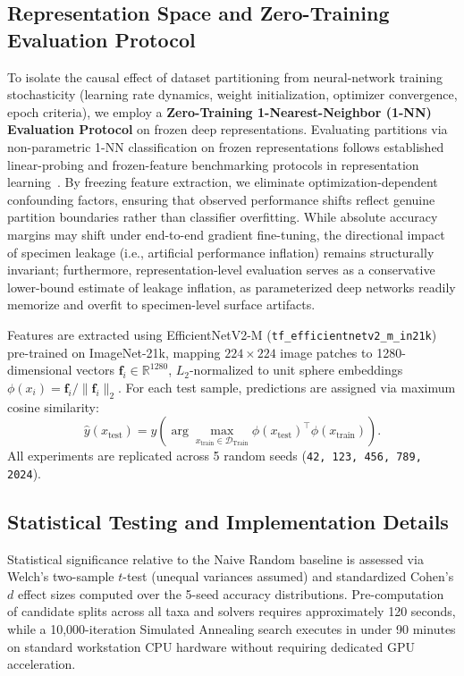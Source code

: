 \documentclass[a4paper,fleqn]{cas-sc}
\begin{document}
\subsection{Representation Space and Zero-Training Evaluation Protocol}
To isolate the causal effect of dataset partitioning from neural-network training stochasticity (learning rate dynamics, weight initialization, optimizer convergence, epoch criteria), we employ a \textbf{Zero-Training 1-Nearest-Neighbor (1-NN) Evaluation Protocol} on frozen deep representations. Evaluating partitions via non-parametric 1-NN classification on frozen representations follows established linear-probing and frozen-feature benchmarking protocols in representation learning~\cite{scikit}. By freezing feature extraction, we eliminate optimization-dependent confounding factors, ensuring that observed performance shifts reflect genuine partition boundaries rather than classifier overfitting. While absolute accuracy margins may shift under end-to-end gradient fine-tuning, the directional impact of specimen leakage (i.e., artificial performance inflation) remains structurally invariant; furthermore, representation-level evaluation serves as a conservative lower-bound estimate of leakage inflation, as parameterized deep networks readily memorize and overfit to specimen-level surface artifacts.

Features are extracted using EfficientNetV2-M (\texttt{tf\_efficientnetv2\_m\_in21k})~\cite{efficientnetv2} pre-trained on ImageNet-21k, mapping $224\times224$ image patches to 1280-dimensional vectors $\boldsymbol{f}_i \in \mathbb{R}^{1280}$, $L_2$-normalized to unit sphere embeddings $\phi(x_i) = \boldsymbol{f}_i / \|\boldsymbol{f}_i\|_2$. For each test sample, predictions are assigned via maximum cosine similarity:
\begin{equation}
\hat{y}(x_{\text{test}}) = y\left( \arg\max_{x_{\text{train}} \in \mathcal{D}_{\text{Train}}} \phi(x_{\text{test}})^{\!\top} \phi(x_{\text{train}}) \right).
\end{equation}
All experiments are replicated across 5 random seeds (\texttt{42, 123, 456, 789, 2024}).

\subsection{Statistical Testing and Implementation Details}
Statistical significance relative to the Naive Random baseline is assessed via Welch's two-sample $t$-test (unequal variances assumed) and standardized Cohen's $d$ effect sizes computed over the 5-seed accuracy distributions. Pre-computation of candidate splits across all taxa and solvers requires approximately 120 seconds, while a 10,000-iteration Simulated Annealing search executes in under 90 minutes on standard workstation CPU hardware without requiring dedicated GPU acceleration.
\end{document}
